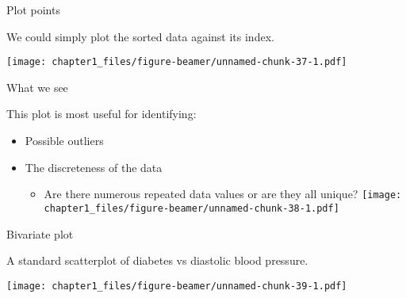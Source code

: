 \begin{frame}[fragile]{Plot points}
\protect\hypertarget{plot-points}{}

We could simply plot the sorted data against its index.

\begin{Shaded}
\begin{Highlighting}[]
\NormalTok{(}\OperatorTok{$}\NormalTok{)}
\end{Highlighting}
\end{Shaded}

\texttt{[image: chapter1\_files/figure-beamer/unnamed-chunk-37-1.pdf]}

\end{frame}

\begin{frame}{What we see}
\protect\hypertarget{what-we-see}{}

This plot is most useful for identifying:

\begin{itemize}
\tightlist
\item
  Possible outliers
\item
  The discreteness of the data

  \begin{itemize}
  \tightlist
  \item
    Are there numerous repeated data values or are they all unique?
    \texttt{[image: chapter1\_files/figure-beamer/unnamed-chunk-38-1.pdf]}
  \end{itemize}
\end{itemize}

\end{frame}

\begin{frame}[fragile]{Bivariate plot}
\protect\hypertarget{bivariate-plot}{}

A standard scatterplot of diabetes vs diastolic blood pressure.

\begin{Shaded}
\begin{Highlighting}[]
\OperatorTok{~}\StringTok{ }
\end{Highlighting}
\end{Shaded}

\texttt{[image: chapter1\_files/figure-beamer/unnamed-chunk-39-1.pdf]}

\end{frame}

